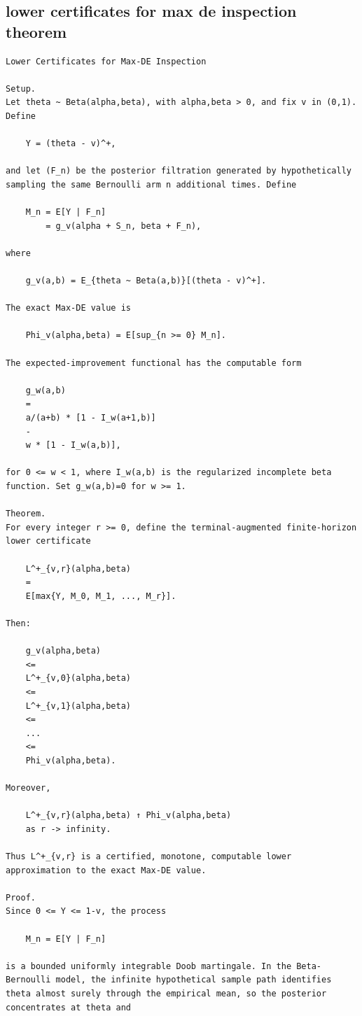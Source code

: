 \subsection{lower certificates for max de inspection theorem}
\begin{small}
\begin{verbatim}
Lower Certificates for Max-DE Inspection

Setup.
Let theta ~ Beta(alpha,beta), with alpha,beta > 0, and fix v in (0,1). Define

    Y = (theta - v)^+,

and let (F_n) be the posterior filtration generated by hypothetically sampling the same Bernoulli arm n additional times. Define

    M_n = E[Y | F_n]
        = g_v(alpha + S_n, beta + F_n),

where

    g_v(a,b) = E_{theta ~ Beta(a,b)}[(theta - v)^+].

The exact Max-DE value is

    Phi_v(alpha,beta) = E[sup_{n >= 0} M_n].

The expected-improvement functional has the computable form

    g_w(a,b)
    =
    a/(a+b) * [1 - I_w(a+1,b)]
    -
    w * [1 - I_w(a,b)],

for 0 <= w < 1, where I_w(a,b) is the regularized incomplete beta function. Set g_w(a,b)=0 for w >= 1.

Theorem.
For every integer r >= 0, define the terminal-augmented finite-horizon lower certificate

    L^+_{v,r}(alpha,beta)
    =
    E[max{Y, M_0, M_1, ..., M_r}].

Then:

    g_v(alpha,beta)
    <=
    L^+_{v,0}(alpha,beta)
    <=
    L^+_{v,1}(alpha,beta)
    <=
    ...
    <=
    Phi_v(alpha,beta).

Moreover,

    L^+_{v,r}(alpha,beta) ↑ Phi_v(alpha,beta)
    as r -> infinity.

Thus L^+_{v,r} is a certified, monotone, computable lower approximation to the exact Max-DE value.

Proof.
Since 0 <= Y <= 1-v, the process

    M_n = E[Y | F_n]

is a bounded uniformly integrable Doob martingale. In the Beta-Bernoulli model, the infinite hypothetical sample path identifies theta almost surely through the empirical mean, so the posterior concentrates at theta and


\end{verbatim}
\end{small}
